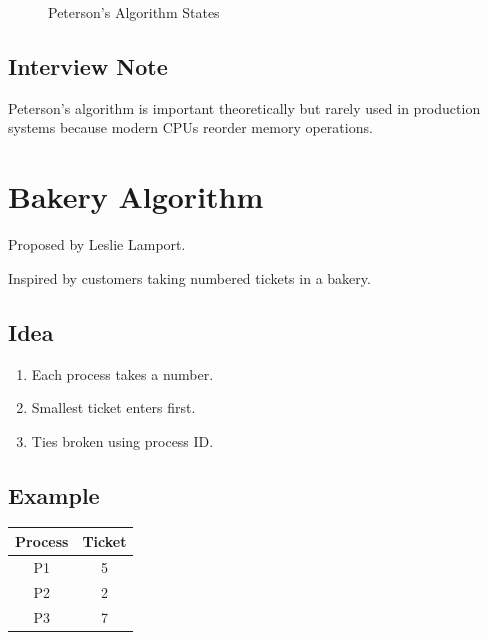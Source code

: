 \begin{figure}[H]
\centering
{}
\caption{Peterson's Algorithm States}
\end{figure}

\subsection{Interview Note}

Peterson's algorithm is important theoretically but rarely used in production systems because modern CPUs reorder memory operations.

\section{Bakery Algorithm}

Proposed by Leslie Lamport.

Inspired by customers taking numbered tickets in a bakery.

\subsection{Idea}

\begin{enumerate}
\item Each process takes a number.
\item Smallest ticket enters first.
\item Ties broken using process ID.
\end{enumerate}

\subsection{Example}

\begin{longtable}{|c|c|}
\hline
Process & Ticket \\
\hline
P1 & 5 \\
\hline
P2 & 2 \\
\hline
P3 & 7 \\
\hline
\end{longtable}


